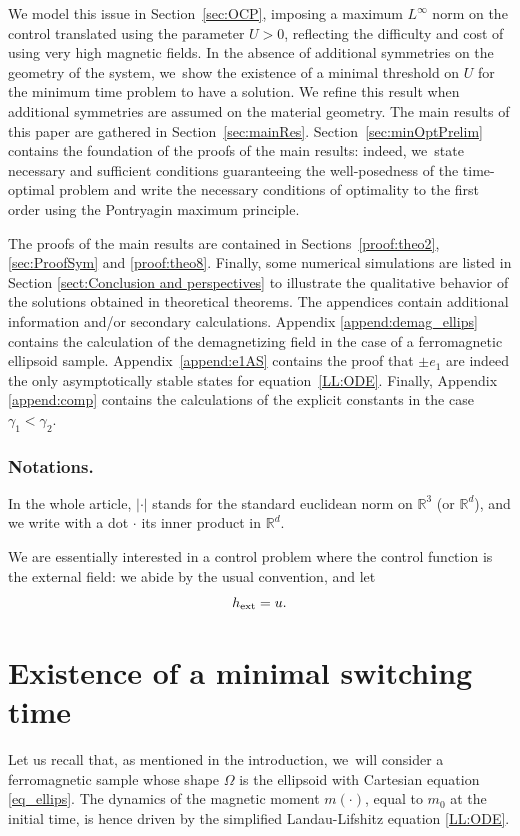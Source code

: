 \documentclass[JEP,XML,SOM,Unicode,NoEqCountersInSection,NoFloatCountersInSection,published]{cedram}
\theoremstyle{definition}
\newcommand{\R} {\mathbb{R}}
\begin{document}
We model this issue in Section~\ref{sec:OCP}, imposing a maximum $L^\infty$ norm on the control translated using the parameter $U>0$, reflecting the difficulty and cost of using very high magnetic fields. In the absence of additional symmetries on the geometry of the system, we~show the existence of a minimal threshold on $U$ for the minimum time problem to have a solution. We refine this result when additional symmetries are assumed on the material geometry. The main results of this paper are gathered in Section~\ref{sec:mainRes}. Section~\ref{sec:minOptPrelim} contains the foundation of the proofs of the main results: indeed, we~state necessary and sufficient conditions guaranteeing the well-posedness of the time-optimal problem and write the necessary conditions of optimality to the first order using the Pontryagin maximum principle.

The proofs of the main results are contained in Sections~\ref{proof:theo2}, \ref{sec:ProofSym} and \ref{proof:theo8}. Finally, some numerical simulations are listed in Section \ref{sect:Conclusion and perspectives} to illustrate the qualitative behavior of the solutions obtained in theoretical theorems. The appendices contain additional information and/or secondary calculations. Appendix \ref{append:demag_ellips} contains the calculation of the demagnetizing field in the case of a ferromagnetic ellipsoid sample. Appendix~\ref{append:e1AS} contains the proof that $\pm e_1$ are indeed the only asymptotically stable states for equation~\eqref{LL:ODE}. Finally, Appendix \ref{append:comp} contains the calculations of the explicit constants in the case $\gamma_1<\gamma_2$.

\subsubsection*{Notations.}
In the whole article, $|\cdot|$ stands for the standard euclidean norm on $\R^3$ (or $\R^d$), and we write with a dot $\cdot$ its inner product in $\R^d$.

We are essentially interested in a control problem where the control function is the external field: we abide by the usual convention, and let
\[ h_{\rm ext}=u. \]

\section{Existence of a minimal switching time}
Let us recall that, as mentioned in the introduction, we~will consider a ferromagnetic sample whose shape $\Omega$ is the ellipsoid with Cartesian equation \eqref{eq_ellips}. The dynamics of the magnetic moment $m(\cdot)$, equal to $m_0$ at the initial time, is hence driven by the simplified Landau-Lifshitz equation \eqref{LL:ODE}.
\end{document}
